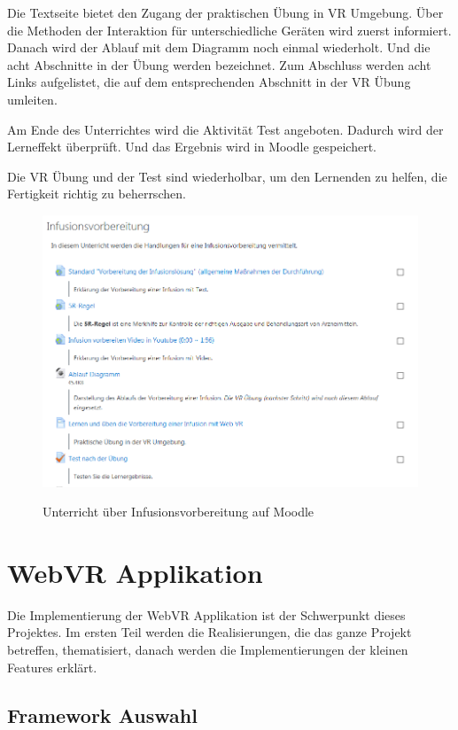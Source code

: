  Die Textseite bietet den Zugang der praktischen Übung in VR Umgebung. Über die Methoden der Interaktion für unterschiedliche Geräten wird zuerst informiert. Danach wird der Ablauf mit dem Diagramm noch einmal wiederholt. Und die acht Abschnitte in der Übung werden bezeichnet. Zum Abschluss werden acht Links aufgelistet, die auf dem entsprechenden Abschnitt in der VR Übung umleiten.
 
 Am Ende des Unterrichtes wird die Aktivität Test angeboten. Dadurch wird der Lerneffekt überprüft. Und das Ergebnis wird in Moodle gespeichert.
 
 Die VR Übung und der Test sind wiederholbar, um den Lernenden zu helfen, die Fertigkeit richtig zu beherrschen.
 
\begin{figure}[ht]
\centering
\vspace{1em}
\caption{Unterricht über Infusionsvorbereitung auf Moodle}
\includegraphics[width=\textwidth]{images/unterricht.png}
\label{fig:unterricht}
\end{figure}
 
\section{WebVR Applikation}
Die Implementierung der WebVR Applikation ist der Schwerpunkt dieses Projektes. Im ersten Teil werden die Realisierungen, die das ganze Projekt betreffen, thematisiert, danach werden die Implementierungen der kleinen Features erklärt.

 \subsection{Framework Auswahl}
 
